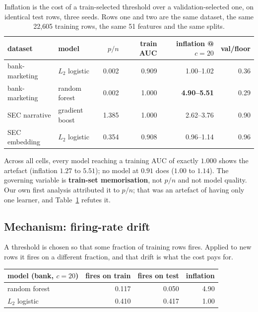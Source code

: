 \documentclass[11pt]{article}
\begin{document}
\begin{table}[t]
\centering\small
\begin{tabular}{llrrrr}
\toprule
dataset & model & $p/n$ & train AUC & inflation @ $c{=}20$ & val/floor \\
\midrule
bank-marketing & $L_2$ logistic  & 0.002 & 0.909 & 1.00--1.02 & 0.36 \\
bank-marketing & random forest   & 0.002 & 1.000 & \textbf{4.90--5.51} & 0.29 \\
SEC narrative  & gradient boost  & 1.385 & 1.000 & 2.62--3.76 & 0.90 \\
SEC embedding  & $L_2$ logistic  & 0.354 & 0.908 & 0.96--1.14 & 0.96 \\
\bottomrule
\end{tabular}
\caption{Inflation is the cost of a train-selected threshold over a validation-selected one, on
identical test rows, three seeds. Rows one and two are the same dataset, the same 22{,}605
training rows, the same 51 features and the same splits.}
\label{tab:strong}
\end{table}

Across all cells, every model reaching a training AUC of exactly $1.000$ shows the artefact
(inflation $1.27$ to $5.51$); no model at $0.91$ does ($1.00$ to $1.14$). The governing variable
is \textbf{train-set memorisation}, not $p/n$ and not model quality. Our own first analysis
attributed it to $p/n$; that was an artefact of having only one learner, and Table~\ref{tab:strong}
refutes it.

\subsection{Mechanism: firing-rate drift}

A threshold is chosen so that some fraction of training rows fires. Applied to new rows it fires
on a different fraction, and that drift is what the cost pays for.

\begin{center}\small
\begin{tabular}{lrrr}
\toprule
model (bank, $c{=}20$) & fires on train & fires on test & inflation \\
\midrule
random forest    & 0.117 & 0.050 & 4.90 \\
$L_2$ logistic   & 0.410 & 0.417 & 1.00 \\
\bottomrule
\end{tabular}
\end{center}
\end{document}
